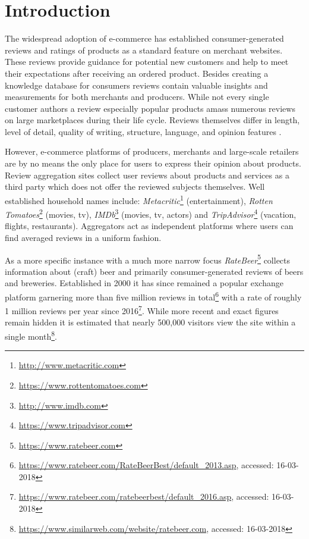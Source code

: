 \section{Introduction}
The widespread adoption of e-commerce has established consumer-generated reviews and ratings of products as a standard feature on merchant websites.
These reviews provide guidance for potential new customers and help to meet their expectations after receiving an ordered product.
Besides creating a knowledge database for consumers reviews contain valuable insights and measurements for both merchants and producers.
While not every single customer authors a review especially popular products amass numerous reviews on large marketplaces during their life cycle.
Reviews themselves differ in length, level of detail, quality of writing, structure, language, and opinion features \cite{Hu2004a}.

However, e-commerce platforms of producers, merchants and large-scale retailers are by no means the only place for users to express their opinion about products.
Review aggregation sites collect user reviews about products and services as a third party which does not offer the reviewed subjects themselves.
Well established household names include: \textit{Metacritic}\footnote{\url{http://www.metacritic.com}} (entertainment), \textit{Rotten Tomatoes}\footnote{\url{https://www.rottentomatoes.com}} (movies, tv), \textit{IMDb}\footnote{\url{http://www.imdb.com}} (movies, tv, actors) and \textit{TripAdvisor}\footnote{\url{https://www.tripadvisor.com}} (vacation, flights, restaurants).
Aggregators act as independent platforms where users can find averaged reviews in a uniform fashion.

As a more specific instance with a much more narrow focus \textit{RateBeer}\footnote{\url{https://www.ratebeer.com}} collects information about (craft) beer and primarily consumer-generated reviews of beers and breweries.
Established in 2000 it has since remained a popular exchange platform garnering more than five million reviews in total\footnote{\url{https://www.ratebeer.com/RateBeerBest/default_2013.asp}, accessed: 16-03-2018} with a rate of roughly 1 million reviews per year since 2016\footnote{\url{https://www.ratebeer.com/ratebeerbest/default_2016.asp}, accessed: 16-03-2018}.
While more recent and exact figures remain hidden it is estimated that nearly 500,000 visitors view the site within a single month\footnote{\url{https://www.similarweb.com/website/ratebeer.com}, accessed: 16-03-2018}.

